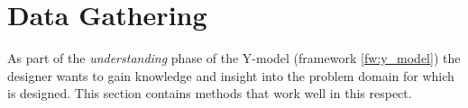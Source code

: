 \section{Data Gathering} \label{sec:data_gathering}
As part of the \emph{understanding} phase of the Y-model (framework \ref{fw:y_model}) the designer wants to gain knowledge and insight into the problem domain for which is designed. This section contains methods that work well in this respect.





